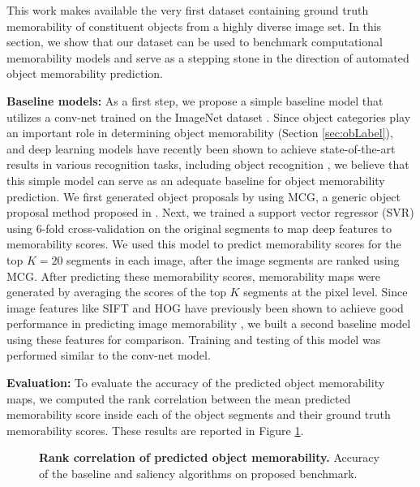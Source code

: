 This work makes available the very first dataset containing ground truth memorability of constituent objects from a highly diverse image set. In this section, we show that our dataset can be used to benchmark computational memorability models and serve as a stepping stone in the direction of automated object memorability prediction.

\vspace{3pt}\noindent\textbf{Baseline models:} As a first step, we propose a simple baseline model that utilizes a conv-net \cite{krizhevsky12,jia14} trained on the ImageNet dataset \cite{deng09}. Since object categories play an important role in determining object memorability (Section \ref{sec:obLabel}), and deep learning models have recently been shown to achieve state-of-the-art results in various recognition tasks, including object recognition \cite{cnn14,lee2009convolutional}, we believe  that this simple model can serve as an adequate baseline for object memorability prediction. We first generated object proposals by using MCG, a generic object proposal method proposed in \cite{arbelaez14}. Next, we trained a support vector regressor (SVR) using $6$-fold cross-validation on the original segments to map deep features to memorability scores. We used this model to predict memorability scores for the top $K=20$ segments in each image, after the image segments are ranked using MCG. After  predicting these memorability scores, memorability maps were generated by averaging the scores of the top $K$ segments at the pixel level. Since image features like SIFT \cite{lowe04} and HOG \cite{dalal05} have previously been shown to achieve good performance in predicting image memorability \cite{isola11,isola14}, we built a second baseline model using these features for comparison. Training and testing of this model was performed similar to the conv-net model.


\vspace{3pt}\noindent \textbf{Evaluation: } To evaluate the accuracy of the predicted object memorability maps, we computed the rank correlation between the mean predicted memorability score inside each of the object segments and their ground truth memorability scores. These results are reported in Figure \ref{fig:benchmark}.



\begin{figure}[b]
\centering
{}
\vspace{-5mm}\caption{\footnotesize\textbf{Rank correlation of predicted object memorability.} Accuracy of the baseline and saliency algorithms on proposed benchmark.}\label{fig:benchmark}\vspace{-12pt}
\end{figure}


